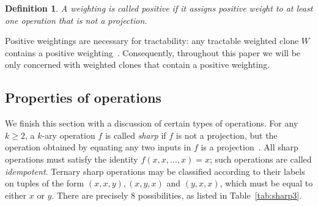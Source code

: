 \documentclass[11pt, reqno]{article}
\newtheorem{definition}{Definition}
\theoremstyle{remark}
\begin{document}
\begin{definition}
%
A weighting is called \emph{positive} if it assigns positive weight to at least
one operation that is not a projection. 
%
\end{definition}

Positive weightings are necessary for tractability: any tractable weighted clone
$W$ contains a positive weighting~\cite[Corollary
7.4]{cccjz13:sicomp}. Consequently, throughout this paper we will be only concerned with weighted
clones that contain a positive weighting.
%

\subsection{Properties of operations}

We finish this section with a discussion of certain types of operations.
%
For any $k\geq 2$, a $k$-ary operation $f$ is called \emph{sharp} if $f$ is not
a projection, but the operation obtained by equating any two inputs in $f$ is a
projection~\cite{Csakany05:minimal}.  All sharp operations must satisfy the
identity $f(x,x,\ldots,x) = x$; such operations are called \emph{idempotent}.
%
Ternary sharp operations may be classified according to their labels on tuples
of the form $(x,x,y), (x,y,x)$ and $(y,x,x)$, which must be equal to either $x$
or $y$. There are precisely $8$ possibilities, as listed in
Table~\ref{tab:sharp3}.
\end{document}
